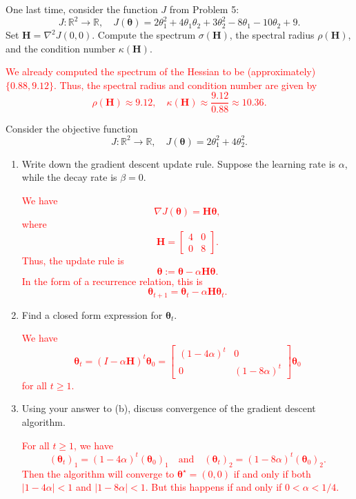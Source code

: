 \documentclass[12pt,reqno]{amsart}
\begin{document}
\prob One last time, consider the function $J$ from Problem 5:
	\[J: \mathbb{R}^2 \to \mathbb{R}, \quad J(\boldsymbol{\theta}) = 2\theta_1^2 + 4\theta_1\theta_2 + 3\theta_2^2 -8\theta_1 - 10\theta_2 + 9.
	\]
Set $\mathbf{H} = \nabla^2J(0,0)$. Compute the spectrum $\sigma(\mathbf{H})$, the spectral radius $\rho( \mathbf{H})$, and the condition number $\kappa(\mathbf{H})$.

\bigskip
\textcolor{red}{We already computed the spectrum of the Hessian to be (approximately) $\{0.88, 9.12\}$. Thus, the spectral radius and condition number are given by
	\[\rho(\mathbf{H} ) \approx 9.12, \quad \kappa(\mathbf{H} ) \approx \frac{9.12}{0.88} \approx 10.36.
	\]}
\bigskip








\prob Consider the objective function
	\[J:\mathbb{R}^2 \to \mathbb{R}, \quad J(\boldsymbol{\theta}) = 2\theta_1^2 + 4\theta_2^2.
	\]


\begin{enumerate}
\item Write down the gradient descent update rule. Suppose the learning rate is $\alpha$, while the decay rate is $\beta=0$.

\bigskip
\textcolor{red}{We have
	\[ \nabla J(\boldsymbol{\theta}) = \mathbf{H} \boldsymbol{\theta},
	\]
where
	\[\mathbf{H} = \begin{bmatrix}
	4 & 0 \\ 0 & 8
	\end{bmatrix}.
	\]
Thus, the update rule is
	\[\boldsymbol{\theta} := \boldsymbol{\theta} - \alpha \mathbf{H} \boldsymbol{\theta}.
	\]
In the form of a recurrence relation, this is
	\[\boldsymbol{\theta}_{t+1} = \boldsymbol{\theta}_t - \alpha \mathbf{H} \boldsymbol{\theta}_t.
	\]}
\bigskip

\item Find a closed form expression for $\boldsymbol{\theta}_t$.

\bigskip
\textcolor{red}{We have
	\[\boldsymbol{\theta}_t = (I-\alpha \mathbf{H})^t \boldsymbol{\theta}_0 = \begin{bmatrix}
	(1-4\alpha)^t & 0 \\ 0 & (1-8\alpha)^t
	\end{bmatrix} \boldsymbol{\theta}_0
	\]
for all $t\geq 1$.}
\bigskip

\item Using your answer to (b), discuss convergence of the gradient descent algorithm.

\bigskip
\textcolor{red}{For all $t\geq 1$, we have
	\[(\boldsymbol{\theta}_t)_1 = (1-4\alpha)^t (\boldsymbol{\theta}_0)_1 \quad \text{and} \quad (\boldsymbol{\theta}_t)_2 = (1-8\alpha)^t (\boldsymbol{\theta}_0)_2.
	\]
Then the algorithm will converge to $\boldsymbol{\theta}^\star = (0,0)$ if and only if both $|1-4\alpha|<1$ and $|1-8\alpha|<1$. But this happens if and only if $0 < \alpha < 1/4$.}
\bigskip
\end{enumerate}
\end{document}
